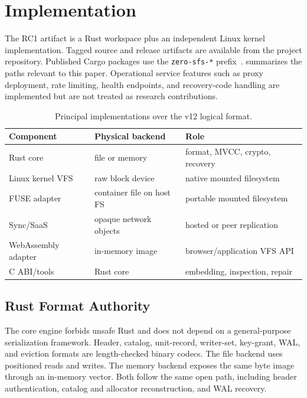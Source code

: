 \section{Implementation}
\label{sec:impl}

The RC1 artifact is a Rust workspace plus an independent Linux kernel
implementation. Tagged source and release artifacts are available from the
project repository.  Published Cargo packages use the \texttt{zero-sfs-*}
prefix~\citep{SfsArtifact2026}.  summarizes the paths
relevant to this paper. Operational service features such as proxy deployment,
rate limiting, health endpoints, and recovery-code handling are implemented
but are not treated as research contributions.

\begin{table}[t]
  \centering
  \small
  \caption{Principal implementations over the v12 logical format.}
  \label{tab:artifact}
  \begin{tabular}{@{}lll@{}}
    \toprule
    Component & Physical backend & Role \\
    \midrule
    Rust core & file or memory & format, MVCC, crypto, recovery \\
    Linux kernel VFS & raw block device & native mounted filesystem \\
    FUSE adapter & container file on host FS & portable mounted filesystem \\
    Sync/SaaS & opaque network objects & hosted or peer replication \\
    WebAssembly adapter & in-memory image & browser/application VFS API \\
    C ABI/tools & Rust core & embedding, inspection, repair \\
    \bottomrule
  \end{tabular}
\end{table}

\subsection{Rust Format Authority}

The core engine forbids unsafe Rust and does not depend on a general-purpose
serialization framework.  Header, catalog, unit-record, writer-set, key-grant,
WAL, and eviction formats are length-checked binary codecs.  The file backend
uses positioned reads and writes.  The memory backend exposes the same byte
image through an in-memory vector.  Both follow the same open path, including
header authentication, catalog and allocator reconstruction, and WAL recovery.

